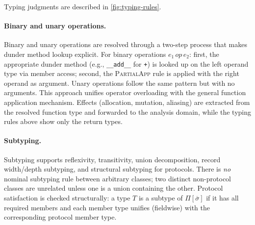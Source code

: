 Typing judgments are described in \cref{fig:typing-rules}.

\paragraph{Binary and unary operations.}
Binary and unary operations are resolved through a two-step process that makes dunder method lookup explicit. For binary operations $e_1 \mathit{\,op\,} e_2$: first, the appropriate dunder method (e.g., \texttt{\_\_add\_\_} for \texttt{+}) is looked up on the left operand type via member access; second, the \textsc{PartialApp} rule is applied with the right operand as argument. Unary operations follow the same pattern but with no arguments. This approach unifies operator overloading with the general function application mechanism. Effects (allocation, mutation, aliasing) are extracted from the resolved function type and forwarded to the analysis domain, while the typing rules above show only the return types.

\paragraph{Subtyping.}  
Subtyping supports reflexivity, transitivity, union decomposition, record width/depth subtyping, and structural subtyping for protocols.  
There is \emph{no} nominal subtyping rule between arbitrary classes; two distinct non-protocol classes are unrelated unless one is a union containing the other.  
Protocol satisfaction is checked structurally: a type $T$ is a subtype of $\Pi[\overline{\sigma}]$ if it has all required members and each member type unifies (fieldwise) with the corresponding protocol member type.

